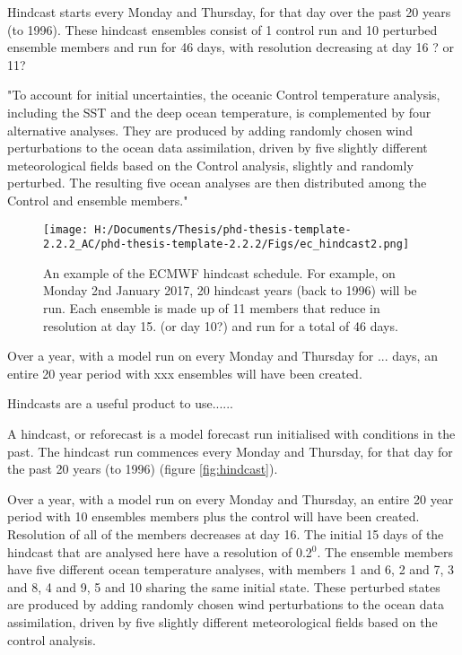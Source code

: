 Hindcast starts every Monday and Thursday, for that day over the past 20 years (to 1996). These hindcast ensembles consist of 1 control run and 10 perturbed ensemble members and run for 46 days, with resolution decreasing at day 16 ? or 11?

"To account for initial uncertainties, the oceanic Control temperature analysis, including the SST and the deep ocean temperature, is complemented by four alternative analyses. They are produced by adding randomly chosen wind perturbations to the ocean data assimilation, driven by five slightly different meteorological fields based on the Control analysis, slightly and randomly perturbed. The resulting five ocean analyses are then distributed among the Control and ensemble members."

\begin{figure}
	
	\texttt{[image: H:/Documents/Thesis/phd-thesis-template-2.2.2\_AC/phd-thesis-template-2.2.2/Figs/ec\_hindcast2.png]}
	\caption{An example of the ECMWF hindcast schedule. For example, on Monday 2nd January 2017, 20 hindcast years (back to 1996) will be run. Each ensemble is made up of 11 members that reduce in resolution at day 15. (or day 10?) and run for a total of 46 days.}\label{fig:ecmwf_hindcast}
	\centering
\end{figure}

Over a year, with a model run on every Monday and Thursday for ... days, an entire 20 year period with xxx ensembles will have been created.

Hindcasts are a useful product to use......

A hindcast, or reforecast is a model forecast run initialised with conditions in the past. The hindcast run commences every Monday and Thursday, for that day for the past 20 years (to 1996) (figure \ref{fig:hindcast}).


Over a year, with a model run on every Monday and Thursday, an entire 20 year period with 10 ensembles members plus the control will have been created. Resolution of all of the members decreases at day 16. The initial 15 days of the hindcast that are analysed here have a resolution of 0.2$^0$. The ensemble members have five different ocean temperature analyses, with members 1 and 6, 2 and 7, 3 and 8, 4 and 9, 5 and 10 sharing the same initial state. These perturbed states are produced by adding randomly chosen wind perturbations to the ocean data assimilation, driven by five slightly different meteorological fields based on the control analysis.

